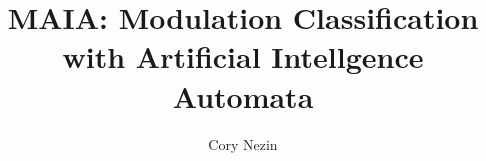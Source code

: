 \documentclass[12pt]{article}
\begin{document}
\title{MAIA: Modulation Classification with Artificial Intellgence Automata}
\author{Cory Nezin}
\maketitle
%
%

\end{document}
